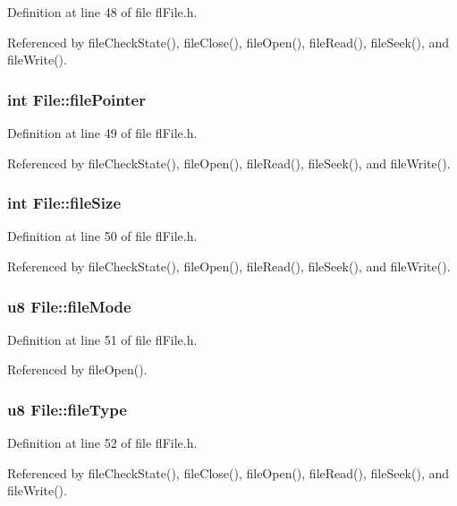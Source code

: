 Definition at line 48 of file fl\-File.h.

Referenced by file\-Check\-State(), file\-Close(), file\-Open(), file\-Read(), file\-Seek(), and file\-Write().
\subsubsection{\setlength{\rightskip}{0pt plus 5cm}int {\bf File::file\-Pointer}}\label{structFile_69ec9581a8c4a6849fc8a5aadcc764a7}




Definition at line 49 of file fl\-File.h.

Referenced by file\-Check\-State(), file\-Open(), file\-Read(), file\-Seek(), and file\-Write().
\subsubsection{\setlength{\rightskip}{0pt plus 5cm}int {\bf File::file\-Size}}\label{structFile_34a7d1a9ebaf62c2e91ffef082ae3582}




Definition at line 50 of file fl\-File.h.

Referenced by file\-Check\-State(), file\-Open(), file\-Read(), file\-Seek(), and file\-Write().
\subsubsection{\setlength{\rightskip}{0pt plus 5cm}u8 {\bf File::file\-Mode}}\label{structFile_4cd7c4842719e99d8dfaefd91980c3f2}




Definition at line 51 of file fl\-File.h.

Referenced by file\-Open().
\subsubsection{\setlength{\rightskip}{0pt plus 5cm}u8 {\bf File::file\-Type}}\label{structFile_44ec622ee4a3cb4ad511b3ef1734cfbd}




Definition at line 52 of file fl\-File.h.

Referenced by file\-Check\-State(), file\-Close(), file\-Open(), file\-Read(), file\-Seek(), and file\-Write().
